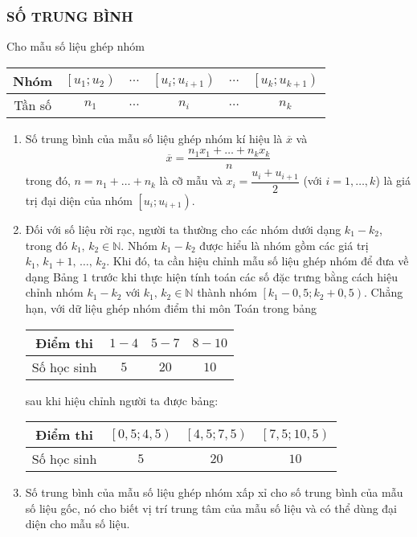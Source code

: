 \subsubsection{SỐ TRUNG BÌNH}
Cho mẫu số liệu ghép nhóm 
\begin{center}
	\begin{tabular}{|c|c|c|c|c|c|}
		\hline
		Nhóm	&$\left[u_1;u_2 \right)$ & $\ldots$ & $\left[u_i;u_{i+1} \right)$ & $\ldots$ &$\left[u_k;u_{k+1} \right)$ \\
		\hline
		Tần số 	& $n_1$ & $\ldots$ & $n_i$ & $\ldots$ & $n_k$ \\
		\hline
	\end{tabular}	
\end{center}
\begin{enumerate}[\iconMT]
	\item {} 
	\begin{tcolorbox}[colframe=cyan,colback=red!3!white,boxrule=0.5mm]
		Số trung bình của mẫu số liệu ghép nhóm kí hiệu là $\overline{x}$ và $$\overline{x}=\dfrac{n_1x_1+\ldots+n_kx_k}{n}$$
		trong đó, $n=n_1+\ldots+n_k$ là cỡ mẫu và $x_i=\dfrac{u_i+u_{i+1}}{2}$ (với $i=1,\ldots,k$) là giá trị đại diện của nhóm $\left[u_i;u_{i+1} \right)$.
	\end{tcolorbox}
	\item {} Đối với số liệu rời rạc, người ta thường cho các nhóm dưới dạng $k_1-k_2$, trong đó $k_1,\,k_2\in \mathbb{N}$. Nhóm $k_1-k_2$ được hiểu là nhóm gồm các giá trị $k_1,\,k_1+1,\,\ldots,\,k_2$. Khi đó, ta cần hiệu chỉnh mẫu số liệu ghép nhóm để đưa về dạng Bảng $1$ trước khi thực hiện tính toán các số đặc trưng bằng cách hiệu chỉnh nhóm $k_1-k_2$ với $k_1,\,k_2\in \mathbb{N}$ thành nhóm $\left[k_1-0{,}5;k_2+0{,}5 \right)$. Chẳng hạn, với dữ liệu ghép nhóm điểm thi môn Toán trong bảng 
	\begin{center}
		\begin{tabular}{|c|c|c|c|}
			\hline
			Điểm thi	& $1-4$ & $5-7$ &$8-10$ \\
			\hline
			Số học sinh	& $5$ & $20$ & $10$ \\
			\hline
		\end{tabular}
	\end{center}
	sau khi hiệu chỉnh người ta được bảng:
	\begin{center}
		\begin{tabular}{|c|c|c|c|}
			\hline
			Điểm thi	& $\left[0{,}5;4{,}5 \right)$ & $\left[4{,}5;7{,}5 \right)$ &$\left[7{,}5;10{,}5 \right)$ \\
			\hline
			Số học sinh	& $5$ & $20$ & $10$ \\
			\hline
		\end{tabular} 
	\end{center}
	\item {} Số trung bình của mẫu số liệu ghép nhóm xấp xỉ cho số trung bình của mẫu số liệu gốc, nó cho biết vị trí trung tâm của mẫu số liệu và có thể dùng đại diện cho mẫu số liệu. 
\end{enumerate}
